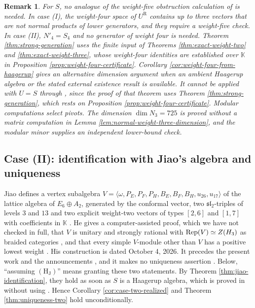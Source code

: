 \documentclass[leqno]{article}
\newcommand{\K}{\ensuremath{\mathbb{K}}}
\let\cal\relax
\newcommand{\cal}{\mathcal}
\newcommand{\la}{\langle}
\newcommand{\ra}{\rangle}
\DeclareMathOperator{\Rep}{Rep}
\newtheorem{remark}[thm]{Remark}
\numberwithin{equation}{section}
\begin{document}
\begin{remark}\normalfont
\label{rem:no-weight-five}
For $S$, no analogue of the weight-five obstruction calculation of \cite[Proposition 4.2]{Rie26b} is needed. In case (I), the weight-four space of $U^{\mathrm R}$ contains up to three vectors that are not normal products of lower generators, and they require a weight-five check. In case (II), $N'_4 = S_4$ and no generator of weight four is needed. Theorem \ref{thm:strong-generation} uses the finite input of Theorems \ref{thm:exact-weight-two} and \ref{thm:exact-weight-three}, whose weight-four identities are established over $\K$ in Proposition \ref{prop:weight-four-certificate}. Corollary \ref{cor:weight-four-from-haagerup} gives an alternative dimension argument when an ambient Haagerup algebra or the stated external existence result is available. It cannot be applied with $U = S$ through \cite[Theorem 6.1]{ArhIII}, since the proof of that theorem uses Theorem \ref{thm:strong-generation}, which rests on Proposition \ref{prop:weight-four-certificate}. Modular computations select pivots. The dimension $\dim N_3 = 725$ is proved without a matrix computation in Lemma \ref{lem:normal-weight-three-dimension}, and the modular minor supplies an independent lower-bound check.
\end{remark}

\subsection{Case (II): identification with Jiao's algebra and uniqueness}
\label{subsec:jiao}

Jiao \cite{Jia26} defines a vertex subalgebra $V = \la \omega, P_E, P_F, P_H, B_E, B_F, B_H, u_{26}, u_{17}\ra$ of the lattice algebra of $E_6 \oplus A_2$, generated by the conformal vector, two $\mathfrak{sl}_2$-triples of levels $3$ and $13$ and two explicit weight-two vectors of types $[2,6]$ and $[1,7]$ with coefficients in $\K$ \cite[Section 3]{Jia26}. He gives a computer-assisted proof, which we have not checked in full, that $V$ is unitary and strongly rational with $\Rep(V) \simeq Z(\cal H_3)$ as braided categories \cite[Theorem 1.1]{Jia26}, and that every simple $V$-module other than $V$ has a positive lowest weight \cite[Corollary 6.8]{Jia26}. His construction is dated October 4, 2026. It precedes the present work and the announcements \cite{Rie26,Hua26}, and it makes no uniqueness assertion \cite[Section 1.2]{Jia26}. Below, ``assuming $\mathrm{(H_J)}$'' means granting these two statements. By Theorem \ref{thm:jiao-identification}, they hold as soon as $S$ is a Haagerup algebra, which is proved in \cite[Theorem 6.1]{ArhIII} without using \cite{Jia26}. Hence Corollary \ref{cor:case-two-realized} and Theorem \ref{thm:uniqueness-two} hold unconditionally.
\end{document}
